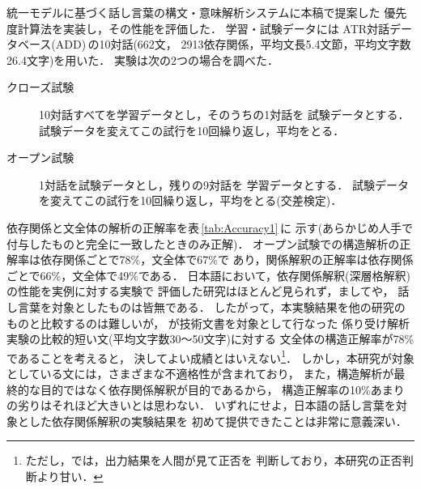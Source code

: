 統一モデルに基づく話し言葉の構文・意味解析システムに本稿で提案した
優先度計算法を実装し，その性能を評価した．
学習・試験データには
ATR対話データベース(ADD)\,\cite{江原:ATR-TR-I-0186}の10対話(662文，
2913依存関係，平均文長5.4文節，平均文字数26.4文字)を用いた．
実験は次の2つの場合を調べた．
\begin{description}
  \item[クローズ試験] 10対話すべてを学習データとし，そのうちの1対話を
試験データとする．
試験データを変えてこの試行を10回繰り返し，平均をとる．
  \item[オープン試験] 1対話を試験データとし，残りの9対話を
学習データとする．
試験データを変えてこの試行を10回繰り返し，平均をとる(交差検定)．
\end{description}

依存関係と文全体の解析の正解率を表\,\ref{tab:Accuracy1}\,に
示す(あらかじめ人手で付与したものと完全に一致したときのみ正解)．
オープン試験での構造解析の正解率は依存関係ごとで78\%，文全体で67\%で
あり，関係解釈の正解率は依存関係ごとで66\%，文全体で49\%である．
日本語において，依存関係解釈(深層格解釈)の性能を実例に対する実験で
評価した研究はほとんど見られず，ましてや，
話し言葉を対象としたものは皆無である．
したがって，本実験結果を他の研究のものと比較するのは難しいが，
が技術文書を対象として行なった
係り受け解析実験の比較的短い文(平均文字数30〜50文字)に対する
文全体の構造正解率が78\%であることを考えると，
決してよい成績とはいえない\footnote{
  ただし，では，出力結果を人間が見て正否を
判断しており，本研究の正否判断より甘い．
}．
しかし，本研究が対象としている文には，さまざまな不適格性が含まれており，
また，構造解析が最終的な目的ではなく依存関係解釈が目的であるから，
構造正解率の10\%あまりの劣りはそれほど大きいとは思わない．
いずれにせよ，日本語の話し言葉を対象とした依存関係解釈の実験結果を
初めて提供できたことは非常に意義深い．

